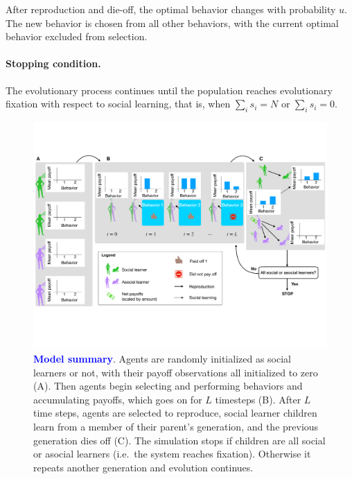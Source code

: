 \documentclass[letterpaper,11.5pt]{scrartcl}
\newcommand{\cm}[1]{{\textcolor{mypurple} {({\tiny CM:} #1)}}}
\newcommand{\edit}[1]{{\bfseries \textcolor{blue} {#1}}}
\begin{document}
After reproduction and die-off, the optimal behavior changes with probability
$u$. The new behavior is chosen from all other behaviors, with the 
current optimal behavior excluded from selection.

\paragraph{Stopping condition.} The evolutionary process continues until the
population reaches evolutionary fixation with respect to social learning, that is, when
$\sum_i s_i = N$ or $\sum_i s_i = 0$. 

\clearpage

\begin{figure}
  \caption{\edit{Model summary}. Agents are randomly initialized as social learners or not, with their
  payoff observations all initialized to zero (A). Then agents begin selecting
and performing behaviors and accumulating payoffs, which goes on for $L$
timesteps (B). After $L$ time steps, agents are selected to reproduce,
social learner children learn from a member of their parent's generation, and
the previous generation dies off (C). The simulation stops if children are all
social or asocial learners (i.e.\ the system reaches fixation).
Otherwise it repeats another generation and evolution continues.} 
  \label{fig:schematic}
  \centering
    \includegraphics[width=1.05\textwidth]{Figures/IntraInterGenerationalDynamics.pdf}
\end{figure}
\end{document}
